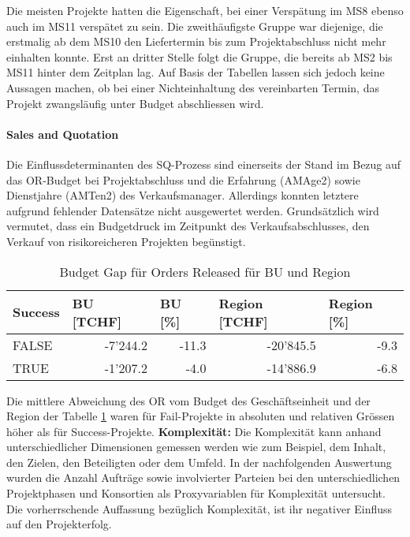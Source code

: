 Die meisten Projekte hatten die Eigenschaft, bei einer Verspätung im MS8 ebenso auch im MS11 verspätet zu sein. Die zweithäufigste Gruppe war diejenige, die erstmalig ab dem MS10 den Liefertermin bis zum Projektabschluss nicht mehr einhalten konnte. Erst an dritter Stelle folgt die Gruppe, die bereits ab MS2 bis MS11 hinter dem Zeitplan lag. Auf Basis der Tabellen lassen sich jedoch keine Aussagen machen, ob bei einer Nichteinhaltung des vereinbarten Termin, das Projekt zwangsläufig unter Budget abschliessen wird. 
\paragraph[short title]{Sales and Quotation} Die Einflussdeterminanten des SQ-Prozess sind einerseits der Stand im Bezug auf das OR-Budget bei Projektabschluss und die Erfahrung (AMAge2) sowie Dienstjahre (AMTen2) des Verkaufsmanager. Allerdings konnten letztere aufgrund fehlender Datensätze nicht ausgewertet werden. Grundsätzlich wird vermutet, dass ein Budgetdruck im Zeitpunkt des Verkaufsabschlusses, den Verkauf von risikoreicheren Projekten begünstigt. 
\begin{table}[H]
	\centering
	\caption{Budget Gap für Orders Released für BU und Region}
	\begin{tabular}{lrr|rr}
		\textbf{Success} & \multicolumn{1}{l}{\textbf{BU [TCHF]}} & \multicolumn{1}{l}{\textbf{BU [\%]}} & \multicolumn{1}{l}{\textbf{Region [TCHF]}} & \multicolumn{1}{l}{\textbf{Region [\%]}} \\\hline
		FALSE & -7'244.2 & -11.3 & -20'845.5 & -9.3 \\
		TRUE  & -1'207.2 & -4.0  & -14'886.9 & -6.8 \\
	\end{tabular}%
	\label{msq}%
\end{table}%
Die mittlere Abweichung des OR vom Budget des Geschäftseinheit und der Region der Tabelle \ref{msq} waren für Fail-Projekte in absoluten und relativen Grössen höher als für Success-Projekte.  
\newline\newline\textbf{Komplexität:} Die Komplexität kann anhand unterschiedlicher Dimensionen gemessen werden wie zum Beispiel, dem Inhalt, den Zielen, den Beteiligten oder dem Umfeld. In der nachfolgenden Auswertung wurden die Anzahl Aufträge sowie involvierter Parteien bei den unterschiedlichen Projektphasen und Konsortien als Proxyvariablen für Komplexität untersucht. Die vorherrschende Auffassung bezüglich Komplexität, ist ihr negativer Einfluss auf den Projekterfolg.
